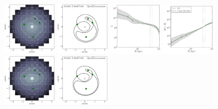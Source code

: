 \documentclass[galley,usenatbib]{mn2e}
\begin{document}
\begin{figure}
\includegraphics[width=0.24\textwidth]{BCQuadR1a-nosymm_tms-appendix-a.pdf}
\includegraphics[width=0.24\textwidth]{BCQuadR1a-nosymm_tms-appendix-b.pdf}
\includegraphics[width=0.24\textwidth]{BCQuadR1a-nosymm_tms-appendix-c.pdf}
\includegraphics[width=0.24\textwidth]{BCQuadR1a-nosymm_tms-appendix-d.pdf}\\
%
\includegraphics[width=0.24\textwidth]{BCQuadR1a-nosymm_Tms-appendix-a-1.pdf}
\includegraphics[width=0.24\textwidth]{BCQuadR1a-nosymm_Tms-appendix-b-1.pdf}

\end{figure}
\end{document}
